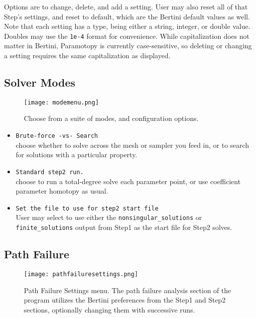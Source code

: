 Options are to change, delete, and add a setting.  User may also reset all of that Step's settings, and reset to default, which are the Bertini default values as well.  Note that each setting has a type, being either a string, integer, or double value.  Doubles may use the \texttt{1e-4} format for convenience.  While capitalization does not matter in Bertini, Paramotopy is currently case-sensitive, so deleting or changing a setting requires the same capitalization as displayed.




\subsection{Solver Modes}


\begin{figure}[h]
\begin{center}
\texttt{[image: modemenu.png]}
\caption[Solver Mode Menu]{ Choose from a suite of modes, and configuration options.}
\label{screen:modemenu}
\end{center}
\end{figure}



\begin{itemize}
	\item  {\tt Brute-force -vs- Search}  \\ choose whether to solve across the mesh or sampler you feed in, or to search for solutions with a particular property.
	\item {\tt Standard step2 run.} \\ choose to run a total-degree solve each parameter point, or use coefficient parameter homotopy as usual.
	\item \texttt{Set the file to use for step2 start file} \\ User may select to use either the \texttt{nonsingular\_solutions} or \texttt{finite\_solutions} output from Step1 as the start file for Step2 solves.
\end{itemize}

\subsection{Path Failure}

\begin{figure}[h]
\begin{center}
\texttt{[image: pathfailuresettings.png]}
\caption[Path Failure Settings]{Path Failure Settings menu.  The path failure analysis section of the program utilizes the Bertini preferences from the Step1 and Step2 sections, optionally changing them with successive runs.}
\label{screen:pathfailuremenu}
\end{center}
\end{figure}

